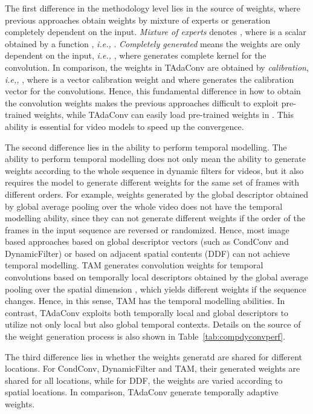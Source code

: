 \documentclass{article} \usepackage{iclr2022_conference,times}
\begin{document}
The first difference in the methodology level lies in the source of weights, where previous approaches obtain weights by mixture of experts or generation completely dependent on the input.
\textit{Mixture of experts} denotes , where  is a scalar obtained by a function , \textit{i.e.,} .
\textit{Completely generated} means the weights are only dependent on the input, \textit{i.e.,} , where  generates complete kernel for the convolution.
In comparison, the weights in TAdaConv are obtained by \textit{calibration}, \textit{i.e,,} , where  is a vector calibration weight and  where  generates the calibration vector for the convolutions.
Hence, this fundamental difference in how to obtain the convolution weights makes the previous approaches difficult to exploit pre-trained weights, while TAdaConv can easily load pre-trained weights in .
This ability is essential for video models to speed up the convergence.

The second difference lies in the ability to perform temporal modelling. The ability to perform temporal modelling does not only mean the ability to generate weights according to the whole sequence in dynamic filters for videos, but it also requires the model to generate different weights for the same set of frames with different orders.
For example, weights generated by the global descriptor obtained by global average pooling over the whole video  does not have the temporal modelling ability, since they can not generate different weights if the order of the frames in the input sequence are reversed or randomized. Hence, most image based approaches based on global descriptor vectors (such as CondConv and DynamicFilter) or based on adjacent spatial contents (DDF) can not achieve temporal modelling. TAM generates convolution weights for temporal convolutions based on temporally local descriptors obtained by the global average pooling over the spatial dimension , which yields different weights if the sequence changes. Hence, in this sense, TAM has the temporal modelling abilities. In contrast, TAdaConv exploits both temporally local and global descriptors to utilize not only local but also global temporal contexts. Details on the source of the weight generation process is also shown in Table~\ref{tab:compdyconvperf}.

The third difference lies in whether the weights generatd are shared for different locations. 
For CondConv, DynamicFilter and TAM, their generated weights are shared for all locations, while for DDF, the weights are varied according to spatial locations. In comparison, TAdaConv generate temporally adaptive weights.
\end{document}
